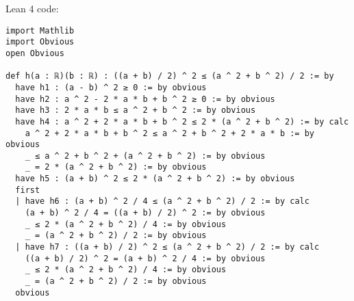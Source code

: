 \documentclass{article}
\begin{document}
Lean 4 code:
\begin{tcolorbox}[colback=white!10, width=\linewidth]
\begin{lstlisting}[language=Lean4]
import Mathlib
import Obvious
open Obvious

def h(a : ℝ)(b : ℝ) : ((a + b) / 2) ^ 2 ≤ (a ^ 2 + b ^ 2) / 2 := by
  have h1 : (a - b) ^ 2 ≥ 0 := by obvious
  have h2 : a ^ 2 - 2 * a * b + b ^ 2 ≥ 0 := by obvious
  have h3 : 2 * a * b ≤ a ^ 2 + b ^ 2 := by obvious
  have h4 : a ^ 2 + 2 * a * b + b ^ 2 ≤ 2 * (a ^ 2 + b ^ 2) := by calc
    a ^ 2 + 2 * a * b + b ^ 2 ≤ a ^ 2 + b ^ 2 + 2 * a * b := by obvious
    _ ≤ a ^ 2 + b ^ 2 + (a ^ 2 + b ^ 2) := by obvious
    _ = 2 * (a ^ 2 + b ^ 2) := by obvious
  have h5 : (a + b) ^ 2 ≤ 2 * (a ^ 2 + b ^ 2) := by obvious
  first
  | have h6 : (a + b) ^ 2 / 4 ≤ (a ^ 2 + b ^ 2) / 2 := by calc
    (a + b) ^ 2 / 4 = ((a + b) / 2) ^ 2 := by obvious
    _ ≤ 2 * (a ^ 2 + b ^ 2) / 4 := by obvious
    _ = (a ^ 2 + b ^ 2) / 2 := by obvious
  | have h7 : ((a + b) / 2) ^ 2 ≤ (a ^ 2 + b ^ 2) / 2 := by calc
    ((a + b) / 2) ^ 2 = (a + b) ^ 2 / 4 := by obvious
    _ ≤ 2 * (a ^ 2 + b ^ 2) / 4 := by obvious
    _ = (a ^ 2 + b ^ 2) / 2 := by obvious
  obvious

\end{lstlisting}
\end{tcolorbox}
\end{document}
